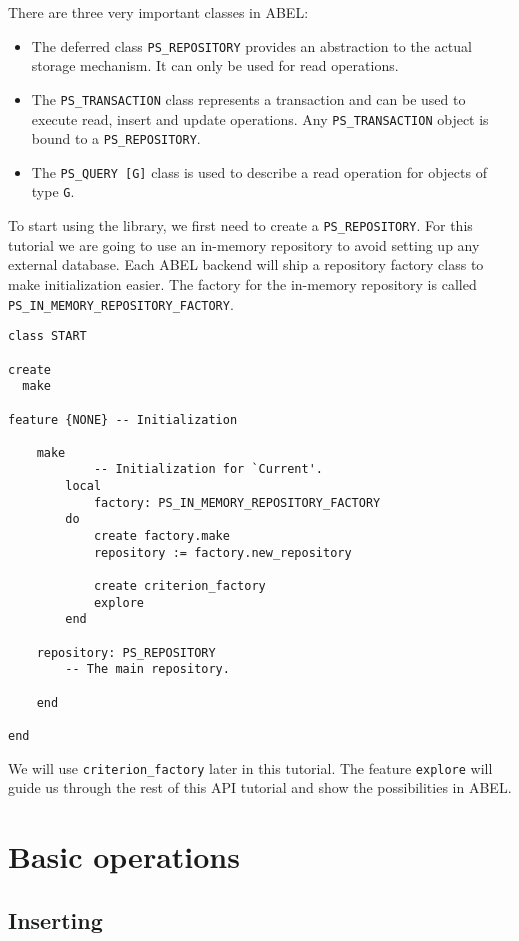 \documentclass[a4paper,12pt]{report}
\begin{document}
There are three very important classes in ABEL:
\begin{itemize}
 \item The deferred class \lstinline!PS_REPOSITORY! provides an abstraction to the actual storage mechanism. It can only be used for read operations.
 \item The \lstinline!PS_TRANSACTION! class represents a transaction and can be used to execute read, insert and update operations. Any \lstinline!PS_TRANSACTION! object is bound to a \lstinline!PS_REPOSITORY!.

 \item The \lstinline!PS_QUERY [G]! class is used to describe a read operation for objects of type \lstinline!G!.

 
\end{itemize}
To start using the library, we first need to create a \lstinline!PS_REPOSITORY!.
For this tutorial we are going to use an in-memory repository to avoid setting up any external database.
Each ABEL backend will ship a repository factory class to make initialization easier.
The factory for the in-memory repository is called \lstinline!PS_IN_MEMORY_REPOSITORY_FACTORY!.

\begin{lstlisting}[language=OOSC2Eiffel, captionpos=b, caption={The START class}, label={lst:tutorial_class}]
class START

create
  make

feature {NONE} -- Initialization

	make
			-- Initialization for `Current'.
		local
			factory: PS_IN_MEMORY_REPOSITORY_FACTORY
		do
			create factory.make
			repository := factory.new_repository
			
			create criterion_factory
			explore
		end

	repository: PS_REPOSITORY
		-- The main repository.

	end

end
\end{lstlisting}
We will use \lstinline!criterion_factory! later in this tutorial.
The feature \lstinline!explore! will guide us through the rest of this API tutorial and show the possibilities in ABEL.

\chapter{Basic operations}

\section{Inserting}
\end{document}
